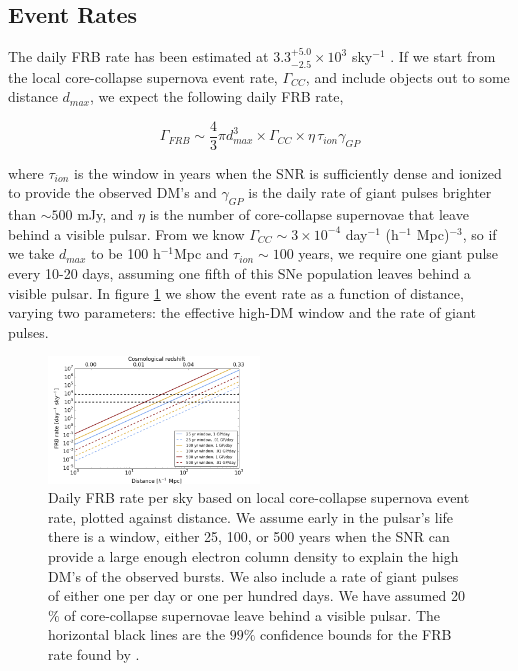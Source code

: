 \documentclass[useAMS,usenatbib]{mn2e}
\begin{document}
\subsection{Event Rates}

The daily FRB rate has been estimated at $3.3^{+5.0}_{-2.5}\times10^3$ sky$^{-1}$ 
\citep{2015arXiv150500834R}. If we start from the local core-collapse supernova
event rate, $\Gamma_{CC}$, and include objects out to some distance $d_{max}$,
we expect the following daily FRB rate, 

\begin{equation}
\Gamma_{FRB} \sim  \frac{4}{3} \pi d_{max}^3 \times \Gamma_{CC} \times
 \eta \, \tau_{ion} \gamma_{GP}
\end{equation}

\noindent where $\tau_{ion}$ is the window in years when the SNR is sufficiently
dense and ionized to provide the observed DM's and $\gamma_{GP}$
is the daily rate of giant pulses brighter than $\sim 500$ mJy, and $\eta$
is the number of core-collapse supernovae that leave behind a visible pulsar. 
From \cite{2014ApJ...792..135T} we know  
$\Gamma_{CC}\sim3 \times 10^{-4}$ day$^{-1}$ (h$^{-1}$ Mpc)$^{-3}$,
so if we take $d_{max}$ to be 100 h$^{-1}$Mpc and $\tau_{ion}\sim100$ years,
we require one giant pulse every 10-20 days, assuming one fifth of this SNe population
leaves behind a visible pulsar.
In figure \ref{FIG-RATE} 
we show the event rate as a function of distance, varying two parameters: the 
effective high-DM window and the rate of giant pulses. 

\begin{figure}
  \centering
   \includegraphics[width=0.5\textwidth]{FRB_SNR_rate.png}
   \caption{Daily FRB rate per sky based on local core-collapse supernova 
   event rate, plotted against distance.
   We assume early in the pulsar's life there is a window, either 
   25, 100, or 500 years when the SNR can provide a large enough electron 
   column density to explain the high DM's of the observed bursts. We also
   include a rate of giant pulses of either one per day or one per hundred
   days. We have assumed 20$\%$ of core-collapse supernovae leave behind
   a visible pulsar.
   The horizontal black lines are the $99\%$ confidence bounds for the FRB rate
   found by \cite{2015arXiv150500834R}.}
   \label{FIG-RATE}
\end{figure}
\end{document}
